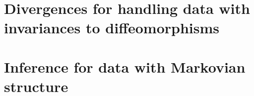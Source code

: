 \documentclass[a4paper,11pt,twoside]{book}
\begin{document}
\pslcover{} %

\frontmatter
%
\AddResumeAbstract %

\begin{singlespace} %
 {}\adjustmtc
\tableofcontents\newpage
\renewcommand{\listfigurename}{Liste des figures}
\listoffigures\adjustmtc %
\listoftables\adjustmtc %
\listofalgorithms
\end{singlespace}

\mainmatter

\part{Divergences for handling data with invariances to diffeomorphisms}\label{part1}


\part{Inference for data with Markovian structure}\label{part2}


\backmatter



\begin{singlespace}
\setlength{}
\small\printbibliography[heading=bibintoc,title=Bibliographie]
\end{singlespace}
\end{document}
